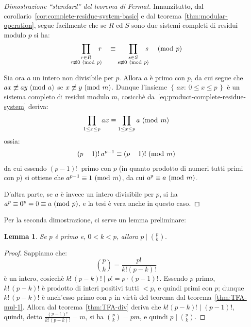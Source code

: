 \documentclass[pdflatex,11pt,a4paper,oneside]{article}
\newcommand{\divides}[0]{\mid}
\newcommand{\congruent}[0]{\equiv}
\newcommand{\mmodop}[0]{\ensuremath{\operatorname{mod}}}
\newcommand{\mmod}[1]{\ensuremath{\allowbreak\ (\mmodop\:{#1})}}
\newcommand{\set}[1]{\ensuremath{\left\{\,{#1}\,\right\}}}
\newcommand{\setdef}[2]{\set{{#1}:\:{#2}}}
\newtheorem*{xlemma}{Lemma}
\begin{document}
\begin{proof}[Dimostrazione ``standard'' del teorema di Fermat]
%
Innanzitutto, dal corollario~\eqref{cor:complete-residue-system-basic}
e dal teorema~\eqref{thm:modular-operation}, segue facilmente che se
$R$ ed $S$ sono due sistemi completi di residui modulo $p$ si ha:
\begin{equation}\label{eq:product-complete-residue-system}
  \prod_{\substack{r \in R\\ r \not\congruent 0 \mmod p}}\!\!\!\! r
  \quad\congruent
  \prod_{\substack{s \in S\\ s \not\congruent 0 \mmod p}}\!\!\!\! s
  \quad\mmod p
\end{equation}

Sia ora $a$ un intero non divisibile per $p$. Allora $a$ \`e primo con
$p$, da cui segue che $ax \not\congruent ay \mmod a$ se $x \not\congruent
y \mmod m$. Dunque l'insieme $\setdef{ax}{0 \leq x \leq p}$ \`e un
sistema completo di residui modulo $m$, cosicch\`e
da~\eqref{eq:product-complete-residue-system} deriva:
\begin{displaymath}
  \prod_{1 \leq x \leq p} ax \congruent \prod_{1 \leq x \leq p} a \mmod m
\end{displaymath}
ossia:
\begin{displaymath}
  (p-1)!\: a^{p-1} \congruent (p-1)! \mmod m
\end{displaymath}
da cui essendo $(p - 1)!$\, primo con $p$ (in quanto prodotto di numeri
tutti primi con $p$) si ottiene che $a^{p-1} \congruent 1 \mmod m$, da cui
$a^p \congruent a \mmod m$.

D'altra parte, se $a$ \`e invece un intero divisibile per $p$, si ha
$a^p \congruent 0^p = 0 \congruent a \mmod p$, e la tesi \`e vera anche
in questo caso.
%
\end{proof}

\noindent
Per la seconda dimostrazione, ci serve un lemma preliminare:

\begin{xlemma}
Se $p$ \`e primo e, $0 < k < p$, allora $p \divides \binom{p}{k}$.
\end{xlemma}
%
\begin{proof}
Sappiamo che:
  $$\binom{p}{k} = \frac{p!}{k! (p - k)!}$$
\`e un intero, cosicch\`e $k!\,(p - k)! \divides p! = p \cdot (p - 1)!$\,.
Essendo $p$ primo, $k!\,(p - k)!$ \`e prodotto di interi positivi tutti
$< p$, e quindi primi con $p$; dunque $k!\,(p - k)!$ \`e anch'esso primo
con $p$ in virt\`u del teorema dal teorema~\eqref{thm:TFA-mul-1}.
Allora dal teorema~\eqref{thm:TFA-div} deriva che $k! (p - k)! \divides
(p - 1)!$, quindi, detto $\frac{(p - 1)!}{k!\,(p - k)!}= m$, si ha
$\binom{p}{k} = pm$, e quindi $p \divides \binom{p}{k}$.
\end{proof}
\end{document}
